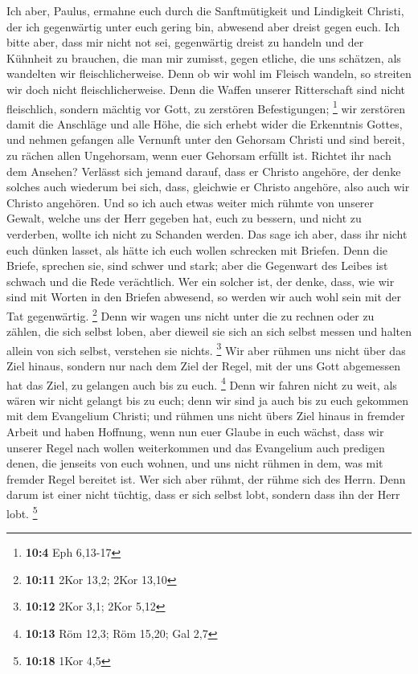  Ich aber, Paulus, ermahne euch durch die Sanftmütigkeit
und Lindigkeit Christi, der ich gegenwärtig unter euch gering bin,
abwesend aber dreist gegen euch.  Ich bitte aber, dass mir
nicht not sei, gegenwärtig dreist zu handeln und der Kühnheit zu
brauchen, die man mir zumisst, gegen etliche, die uns schätzen, als
wandelten wir fleischlicherweise.  Denn ob wir wohl im
Fleisch wandeln, so streiten wir doch nicht fleischlicherweise.
 Denn die Waffen unserer Ritterschaft sind nicht
fleischlich, sondern mächtig vor Gott, zu zerstören Befestigungen;
\footnote{\textbf{10:4} Eph 6,13-17}  wir zerstören damit
die Anschläge und alle Höhe, die sich erhebt wider die Erkenntnis
Gottes, und nehmen gefangen alle Vernunft unter den Gehorsam Christi
 und sind bereit, zu rächen allen Ungehorsam, wenn euer
Gehorsam erfüllt ist.  Richtet ihr nach dem Ansehen?
Verlässt sich jemand darauf, dass er Christo angehöre, der denke solches
auch wiederum bei sich, dass, gleichwie er Christo angehöre, also auch
wir Christo angehören.  Und so ich auch etwas weiter mich
rühmte von unserer Gewalt, welche uns der Herr gegeben hat, euch zu
bessern, und nicht zu verderben, wollte ich nicht zu Schanden werden.
 Das sage ich aber, dass ihr nicht euch dünken lasset, als
hätte ich euch wollen schrecken mit Briefen.  Denn die
Briefe, sprechen sie, sind schwer und stark; aber die Gegenwart des
Leibes ist schwach und die Rede verächtlich.  Wer ein
solcher ist, der denke, dass, wie wir sind mit Worten in den Briefen
abwesend, so werden wir auch wohl sein mit der Tat gegenwärtig.
\footnote{\textbf{10:11} 2Kor 13,2; 2Kor 13,10}  Denn wir
wagen uns nicht unter die zu rechnen oder zu zählen, die sich selbst
loben, aber dieweil sie sich an sich selbst messen und halten allein von
sich selbst, verstehen sie nichts. \footnote{\textbf{10:12} 2Kor 3,1;
  2Kor 5,12}  Wir aber rühmen uns nicht über das Ziel
hinaus, sondern nur nach dem Ziel der Regel, mit der uns Gott abgemessen
hat das Ziel, zu gelangen auch bis zu euch. \footnote{\textbf{10:13} Röm
  12,3; Röm 15,20; Gal 2,7}  Denn wir fahren nicht zu
weit, als wären wir nicht gelangt bis zu euch; denn wir sind ja auch bis
zu euch gekommen mit dem Evangelium Christi;  und rühmen
uns nicht übers Ziel hinaus in fremder Arbeit und haben Hoffnung, wenn
nun euer Glaube in euch wächst, dass wir unserer Regel nach wollen
weiterkommen  und das Evangelium auch predigen denen, die
jenseits von euch wohnen, und uns nicht rühmen in dem, was mit fremder
Regel bereitet ist.  Wer sich aber rühmt, der rühme sich
des Herrn.  Denn darum ist einer nicht tüchtig, dass er
sich selbst lobt, sondern dass ihn der Herr lobt. \footnote{\textbf{10:18}
  1Kor 4,5}

